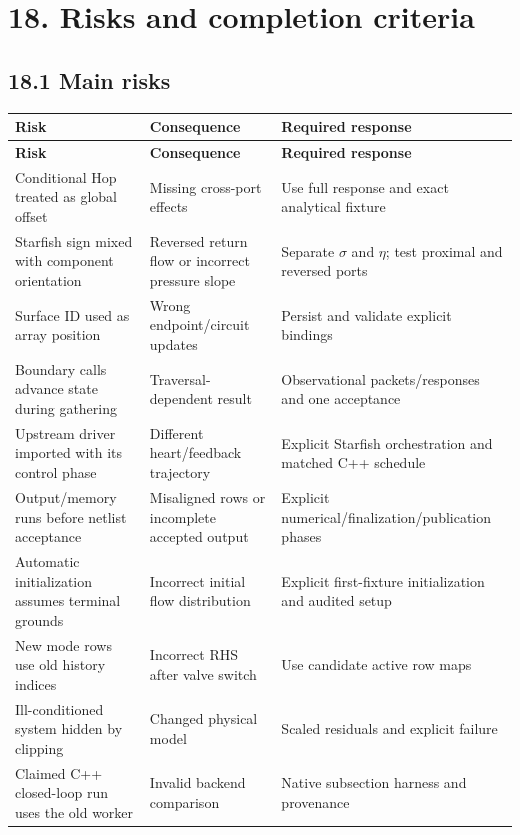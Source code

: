 \documentclass[11pt,a4paper]{article}
\begin{document}
\section{18. Risks and completion criteria}
\subsection{18.1 Main risks}

\begingroup\footnotesize
\setlength{\tabcolsep}{4pt}
\renewcommand{\arraystretch}{1.17}
\begin{longtable}{>{\raggedright\arraybackslash}p{}>{\raggedright\arraybackslash}p{}>{\raggedright\arraybackslash}p{}}
\toprule
\textbf{Risk} & \textbf{Consequence} & \textbf{Required response} \\
\midrule
\endfirsthead
\textbf{Risk} & \textbf{Consequence} & \textbf{Required response} \\
\midrule
\endhead
\bottomrule
\endfoot
Conditional Hop treated as global offset & Missing cross-port effects & Use full response and exact analytical fixture \\[3pt]
Starfish sign mixed with component orientation & Reversed return flow or incorrect pressure slope & Separate \(\sigma\) and \(\eta\); test proximal and reversed ports \\[3pt]
Surface ID used as array position & Wrong endpoint/circuit updates & Persist and validate explicit bindings \\[3pt]
Boundary calls advance state during gathering & Traversal-dependent result & Observational packets/responses and one acceptance \\[3pt]
Upstream driver imported with its control phase & Different heart/feedback trajectory & Explicit Starfish orchestration and matched C++ schedule \\[3pt]
Output/memory runs before netlist acceptance & Misaligned rows or incomplete accepted output & Explicit numerical/finalization/publication phases \\[3pt]
Automatic initialization assumes terminal grounds & Incorrect initial flow distribution & Explicit first-fixture initialization and audited setup \\[3pt]
New mode rows use old history indices & Incorrect RHS after valve switch & Use candidate active row maps \\[3pt]
Ill-conditioned system hidden by clipping & Changed physical model & Scaled residuals and explicit failure \\[3pt]
Claimed C++ closed-loop run uses the old worker & Invalid backend comparison & Native subsection harness and provenance \\[3pt]
\end{longtable}
\endgroup
{}
\end{document}
